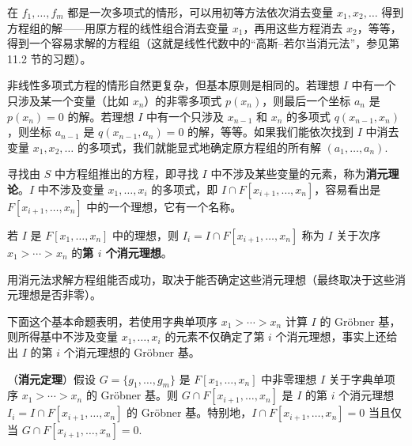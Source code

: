 在 \(f_1, \ldots, f_m\) 都是一次多项式的情形，可以用初等方法依次消去变量 \(x_1, x_2, \ldots\) 得到方程组的解——用原方程的线性组合消去变量 \(x_1\)，再用这些方程消去 \(x_2\)，等等，得到一个容易求解的方程组（这就是线性代数中的“高斯--若尔当消元法”，参见第 11.2 节的习题）。

非线性多项式方程的情形自然更复杂，但基本原则是相同的。若理想 \(I\) 中有一个只涉及某一个变量（比如 \(x_n\)）的非零多项式 \(p(x_n)\)，则最后一个坐标 \(a_n\) 是 \(p(x_n) = 0\) 的解。若理想 \(I\) 中有一个只涉及 \(x_{n-1}\) 和 \(x_n\) 的多项式 \(q(x_{n-1}, x_n)\)，则坐标 \(a_{n-1}\) 是 \(q(x_{n-1}, a_n) = 0\) 的解，等等。如果我们能依次找到 \(I\) 中消去变量 \(x_1, x_2, \ldots\) 的多项式，我们就能显式地确定原方程组的所有解 \((a_1, \ldots, a_n)\).

寻找由 \(S\) 中方程组推出的方程，即寻找 \(I\) 中不涉及某些变量的元素，称为\textbf{消元理论}。\(I\) 中不涉及变量 \(x_1, \ldots, x_i\) 的多项式，即 \(I \cap F[x_{i+1}, \ldots, x_n]\)，容易看出是 \(F[x_{i+1}, \ldots, x_n]\) 中的一个理想，它有一个名称。

\begin{definition}
若 \(I\) 是 \(F[x_1, \ldots, x_n]\) 中的理想，则 \(I_i = I \cap F[x_{i+1}, \ldots, x_n]\) 称为 \(I\) 关于次序 \(x_1 > \cdots > x_n\) 的\textbf{第 \(i\) 个消元理想}。
\end{definition}

用消元法求解方程组能否成功，取决于能否确定这些消元理想（最终取决于这些消元理想是否非零）。

下面这个基本命题表明，若使用字典单项序 \(x_1 > \cdots > x_n\) 计算 \(I\) 的 Gröbner 基，则所得基中不涉及变量 \(x_1, \ldots, x_i\) 的元素不仅确定了第 \(i\) 个消元理想，事实上还给出 \(I\) 的第 \(i\) 个消元理想的 Gröbner 基。

\begin{proposition}\label{pro:9.29}
（\textbf{消元定理}）假设 \(G = \{g_1, \ldots, g_m\}\) 是 \(F[x_1, \ldots, x_n]\) 中非零理想 \(I\) 关于字典单项序 \(x_1 > \cdots > x_n\) 的 Gröbner 基。则 \(G \cap F[x_{i+1}, \ldots, x_n]\) 是 \(I\) 的第 \(i\) 个消元理想 \(I_i = I \cap F[x_{i+1}, \ldots, x_n]\) 的 Gröbner 基。特别地，\(I \cap F[x_{i+1}, \ldots, x_n] = 0\) 当且仅当 \(G \cap F[x_{i+1}, \ldots, x_n] = 0\).
\end{proposition}

